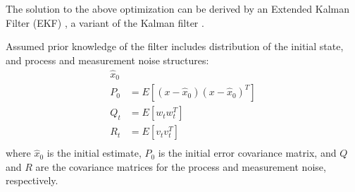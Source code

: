  The solution to the above optimization can be derived by an Extended Kalman Filter (EKF) \cite{zheng_tracking_2005}, a variant of the Kalman filter \cite{brookner_tracking_1998}. 

 Assumed prior knowledge of the filter includes distribution of the initial state, and process and measurement noise structures: 
\begin{equation}\label{eq:filter-initial-state}\begin{split}
  \hat{x}_0  \\ %
  P_0&=E[(x-\hat{x}_0)(x-\hat{x}_0)^T]  \\
  Q_t &= E[w_t w_t^T]  \\
  R_t &= E[v_t v_t^T]  \\ 
 \end{split}\end{equation}   
 where
   $\hat{x}_0$ is the initial estimate,
    $P_0$ is the initial error covariance matrix, and 
   $Q$ and $R$ are the covariance matrices for the process and measurement noise, respectively.
  
